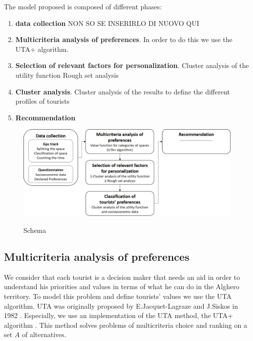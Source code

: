 \documentclass[a4paper]{article}
\begin{document}
The model proposed is composed of different phases:
\begin{enumerate}
\item \textbf{data collection} NON SO SE INSERIRLO DI NUOVO QUI
\item \textbf{Multicriteria analysis of preferences}. In order to do this we use the UTA+ algorithm.
\item \textbf{Selection of relevant factors for personalization}.
\subitem Cluster analysis of the utility function
\subitem Rough set analysis
\item \textbf{Cluster analysis}. Cluster analysis of the results to define the different profiles of tourists
\item \textbf{Recommendation}
\end{enumerate}

\begin{figure} [ht]
  \centering
  \includegraphics[width=\textwidth]{schema}\\
  \caption{Schema}\label{test}
\end{figure}


\subsection {Multicriteria analysis of preferences}
We consider that each tourist is a decision maker that needs an aid in order to understand his priorities and values in terms of what he can do in the Alghero territory.
To model this problem and define tourists' values we use the UTA algorithm.
UTA  was originally proposed by E.Jacquet-Lagraze and J.Siskos in 1982 \cite{Jacquet-Lagreze1982}. Especially, we use an implementation of the UTA method, the UTA+ algorithm \cite{kostkowski1996uta+}. This method solves problems of multicriteria choice and ranking on a set $A$ of alternatives.
\end{document}
